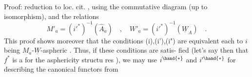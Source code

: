 Proof: reduction to loc. cit. , using the commutative diagram
(up to isomorphism), and the relations
\[ M'_a =(i'^*)^{-1}(\hat{A}_a) \quad , \quad W'_a = (i'^*)^{-1}(\underline{W}_A) \quad . \]
This proof shows moreover that the conditions (i),(i'),(i") are equivalent
each to $i$ being $M_a$-$\underline{W}$-aspheric . Thus, if these conditions are satis-%
fied (let's say then that $f^*$ is a \hand{\uline{\textcolor{black}{morphism}}}\inserted{(*)} for the asphericity structu%
res ), we may use $i^{\hand{*}}$ and $i'^{\hand{*}}$ for describing the canonical functors from

